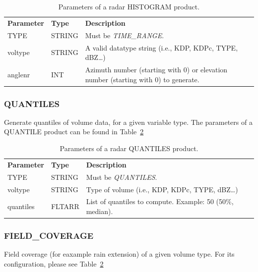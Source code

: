 \documentclass[a4paper,11pt,pdftex,twoside]{scrartcl}
\renewcommand{\bf}{\normalfont \bfseries}
\begin{document}
{{{\begin{table}[H]
 \begin{tabularx}{\textwidth}{llX}
 \bf{Parameter}  & \bf{Type}  & \bf{Description}\\
 TYPE           & STRING     & Must be \emph{TIME\_RANGE}.\\
 voltype       & STRING     & A valid datatype string (i.e., KDP, KDPc, TYPE, dBZ\dots)\\
 anglenr        & INT        & Azimuth number (starting with 0) or elevation number (starting with 0)
                               to generate.\\
 \end{tabularx}
 \caption{Parameters of a radar HISTOGRAM product.}
 \label{tab_product_histogram}
 \end{table}
 
\subsubsection{QUANTILES}
   \label{subsec_quantiles}
Generate quantiles of volume data, for a given variable type. The parameters of a QUANTILE product can be found in Table~\ref{tab_product_quantiles}   
   
   
\begin{table}[H]
 \begin{tabularx}{\textwidth}{llX}
 \bf{Parameter}  & \bf{Type}  & \bf{Description}\\
 TYPE           & STRING     & Must be \emph{QUANTILES}.\\
 voltype        & STRING     & Type of volume (i.e., KDP, KDPc, TYPE, dBZ\dots)\\
 quantiles      & FLTARR     & List of quantiles to compute. Example: 50 (50\%, median).\\
 \end{tabularx}
 \caption{Parameters of a radar QUANTILES product.}
 \label{tab_product_quantiles}
 \end{table}   
    
    
\subsubsection{FIELD\_COVERAGE}
   \label{subsec_field_coverage}
Field coverage (for eaxample rain extension) of a given volume type. For its configuration, please see Table~\ref{tab_product_quantiles}   
   
}}}
\end{document}
